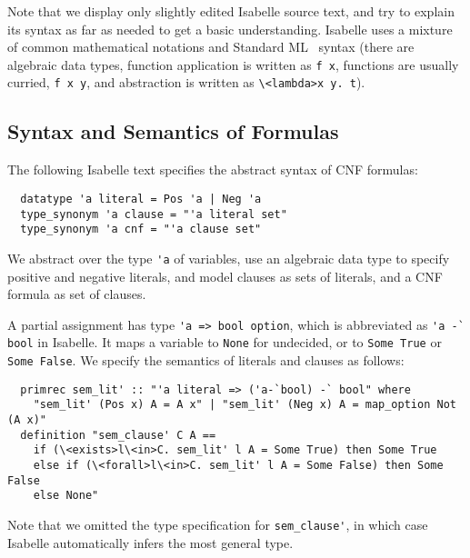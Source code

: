 \documentclass{llncs}
\newcommand{\isai}{\lstinline[language=isabelle,basicstyle=\normalsize\ttfamily\slshape]}
\begin{document}
Note that we display only slightly edited Isabelle source text, and try to explain its syntax as far as needed to get a basic understanding.
Isabelle uses a mixture of common mathematical notations and Standard ML~\cite{MHMT97} syntax (\eg there are algebraic data types, function application is written as 
\isai$f x$, functions are usually curried, \eg \isai$f x y$, and abstraction is written as \isai$\<lambda>x y. t$).


\subsection{Syntax and Semantics of Formulas}
The following Isabelle text specifies the abstract syntax of CNF formulas:
\begin{lstlisting}
  datatype 'a literal = Pos 'a | Neg 'a
  type_synonym 'a clause = "'a literal set"
  type_synonym 'a cnf = "'a clause set"
\end{lstlisting}
We abstract over the type \isai$'a$ of variables, use an algebraic data type to specify positive and negative literals, and model clauses 
as sets of literals, and a CNF formula as set of clauses. 
% 
% 

A partial assignment has 
type \isai{'a => bool option}, which is abbreviated as \isai{'a -` bool} in Isabelle. 
It maps a variable to \isai{None} for undecided, or to \isai{Some True} or \isai{Some False}.
We specify the semantics of literals and clauses as follows:
\begin{lstlisting}
  primrec sem_lit' :: "'a literal => ('a-`bool) -` bool" where
    "sem_lit' (Pos x) A = A x" | "sem_lit' (Neg x) A = map_option Not (A x)"
  definition "sem_clause' C A ==
    if (\<exists>l\<in>C. sem_lit' l A = Some True) then Some True
    else if (\<forall>l\<in>C. sem_lit' l A = Some False) then Some False
    else None"
\end{lstlisting}
Note that we omitted the type specification for \isai{sem_clause'}, in which case Isabelle automatically infers the most general type.
\end{document}
